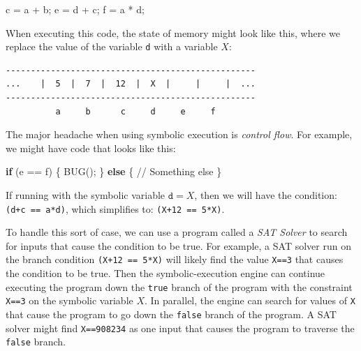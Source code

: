 \documentclass[
  letterpaper,
]{scrbook}
\newenvironment{Shaded}{\begin{snugshade}}{\end{snugshade}}
\newcommand{\CommentTok}[1]{\textcolor[rgb]{0.37,0.37,0.37}{#1}}
\newcommand{\ControlFlowTok}[1]{\textcolor[rgb]{0.00,0.23,0.31}{\textbf{#1}}}
\newcommand{\NormalTok}[1]{\textcolor[rgb]{0.00,0.23,0.31}{#1}}
\newcommand{\OperatorTok}[1]{\textcolor[rgb]{0.37,0.37,0.37}{#1}}
\theoremstyle{definition}
\theoremstyle{plain}
\theoremstyle{plain}
\theoremstyle{remark}
\begin{document}
\begin{Shaded}
\begin{Highlighting}[]
\NormalTok{c }\OperatorTok{=}\NormalTok{ a }\OperatorTok{+}\NormalTok{ b}\OperatorTok{;}
\NormalTok{e }\OperatorTok{=}\NormalTok{ d }\OperatorTok{+}\NormalTok{ c}\OperatorTok{;}
\NormalTok{f }\OperatorTok{=}\NormalTok{ a }\OperatorTok{*}\NormalTok{ d}\OperatorTok{;}
\end{Highlighting}
\end{Shaded}

When executing this code, the state of memory might look like this,
where we replace the value of the variable \texttt{d} with a variable
\(X\):

\begin{verbatim}
--------------------------------------------------
...    |  5  |  7  |  12  |  X  |     |     |  ...
--------------------------------------------------
          a     b      c     d     e     f
\end{verbatim}

The major headache when using symbolic execution is \emph{control flow}.
For example, we might have code that looks like this:

\begin{Shaded}
\begin{Highlighting}[]
\ControlFlowTok{if} \OperatorTok{(}\NormalTok{e }\OperatorTok{==}\NormalTok{ f}\OperatorTok{)} \OperatorTok{\{}
\NormalTok{  BUG}\OperatorTok{();}
\OperatorTok{\}} \ControlFlowTok{else} \OperatorTok{\{}
  \CommentTok{// Something else}
\OperatorTok{\}}
\end{Highlighting}
\end{Shaded}

If running with the symbolic variable \(\mathtt{d} = X\), then we will
have the condition: \texttt{(d+c\ ==\ a*d)}, which simplifies to:
\texttt{(X+12\ ==\ 5*X)}.

To handle this sort of case, we can use a program called a \emph{SAT
Solver} to search for inputs that cause the condition to be true. For
example, a SAT solver run on the branch condition
\texttt{(X+12\ ==\ 5*X)} will likely find the value \texttt{X==3} that
causes the condition to be true. Then the symbolic-execution engine can
continue executing the program down the \texttt{true} branch of the
program with the constraint \texttt{X==3} on the symbolic variable
\(X\). In parallel, the engine can search for values of \texttt{X} that
cause the program to go down the \texttt{false} branch of the program. A
SAT solver might find \texttt{X==908234} as one input that causes the
program to traverse the \texttt{false} branch.
\end{document}
